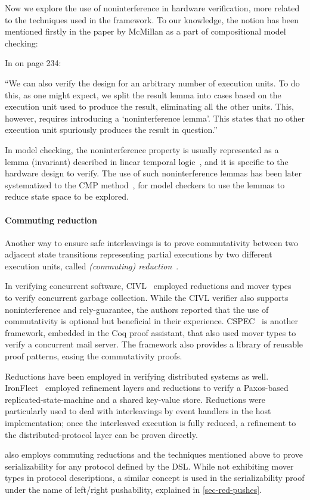 Now we explore the use of noninterference in hardware verification, more related to the techniques used in the \hemiola{} framework.
To our knowledge, the notion has been mentioned firstly in the paper by McMillan as a part of compositional model checking:
\begin{displayquote}
  In \cite{McMillan:1999} on page 234:

  ``We can also verify the design for an arbitrary number of execution units.
  To do this, as one might expect, we split the result lemma into cases based on the execution unit used to produce the result, eliminating all the other units.
  This, however, requires introducing a `noninterference lemma'.
  This states that no other execution unit spuriously produces the result in question.''
\end{displayquote}
In model checking, the noninterference property is usually represented as a lemma (invariant) described in linear temporal logic~\cite{licsBook}, and it is specific to the hardware design to verify.
The use of such noninterference lemmas has been later systematized to the CMP method~\cite{McMillan:1999,McMillan:2001,Chou:2004}, for model checkers to use the lemmas to reduce state space to be explored.

\paragraph{Commuting reduction}

Another way to ensure safe interleavings is to prove commutativity between two adjacent state transitions representing partial executions by two different execution units, called \emph{(commuting) reduction}~\cite{reduction}.

In verifying concurrent software, CIVL~\cite{Hawblitzel:2015} employed reductions and mover types~\cite{Flanagan:2008} to verify concurrent garbage collection.
While the CIVL verifier also supports noninterference and rely-guarantee, the authors reported that the use of commutativity is optional but beneficial in their experience.
CSPEC~\cite{Chajed:2018} is another framework, embedded in the Coq proof assistant, that also used mover types to verify a concurrent mail server.
The framework also provides a library of reusable proof patterns, easing the commutativity proofs.

Reductions have been employed in verifying distributed systems as well.
IronFleet~\cite{Hawblitzel:2017} employed refinement layers and reductions to verify a Paxos-based~\cite{Paxos} replicated-state-machine and a shared key-value store.
Reductions were particularly used to deal with interleavings by event handlers in the host implementation; once the interleaved execution is fully reduced, a refinement to the distributed-protocol layer can be proven directly.

\hemiola{} also employs commuting reductions and the techniques mentioned above to prove serializability for any protocol defined by the \hemiola{} DSL.
While not exhibiting mover types in protocol descriptions, a similar concept is used in the serializability proof under the name of left/right pushability, explained in \autoref{sec-red-pushes}.
